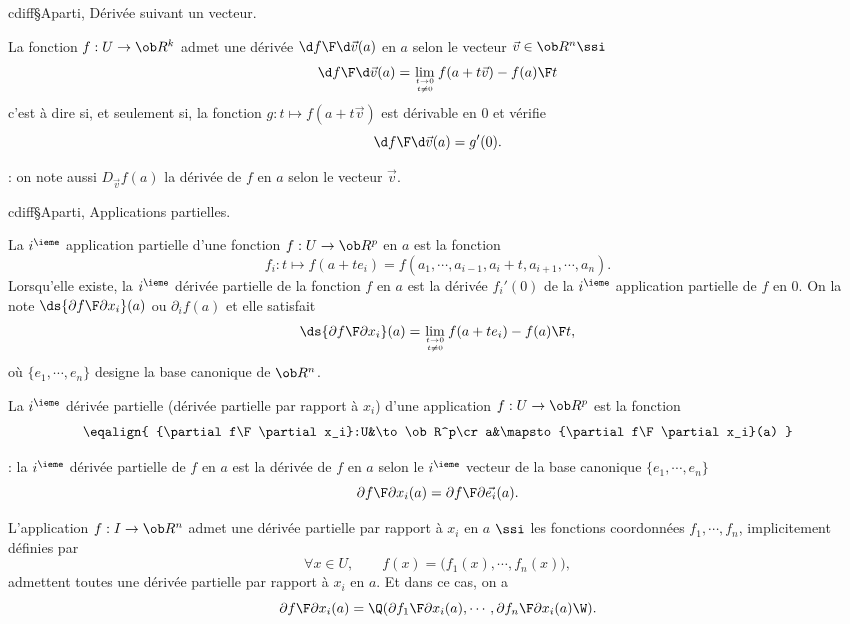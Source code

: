 \Subsection cdiff§Aparti, D\'eriv\'ee suivant un vecteur.


\Definition[$a\in U$ ouvert de $\ob R^n$]
La fonction $f:U\to\ob R^k$ admet une d\'eriv\'ee ${\d f\F\d\vec v}(a)$ en $a$ selon le vecteur $\vec v\in\ob R^n\ssi$ 
$$
{\d f\F\d\vec v}(a)=\lim\limits_{t\to0\atop t\neq 0}{f(a+t\vec v)-f(a)\F t}
$$
c'est \`a dire si, et seulement si, la fonction $g:t\mapsto f(a+t\vec v)$ est d\'erivable en $0$ et v\'erifie $$
{\d f\F\d\vec v}(a)=g'(0).
$$ 

\Remarque : on note aussi $D_{\vec v}f(a)$ la d\'eriv\'ee de $f$ en $a$ selon le vecteur $\vec v$. 
\bigskip

\Subsection cdiff§Aparti, Applications partielles. 

\Definition [$a=(a_1,\cdots,a_n)\in U$ ouvert de $\ob R^n$, $1\le i\le n$]
La $i^\ieme$ application partielle d'une fonction $f:U\to\ob R^p$ en $a$ est la fonction 
$$
f_i:t\mapsto f(a+te_i)=f(a_1,\cdots,a_{i-1},a_i+t,a_{i+1},\cdots,a_n).
$$
Lorsqu'elle existe, la $i^\ieme$ d\'eriv\'ee partielle de la fonction $f$ en $a$ est la d\'eriv\'ee $f_i'(0)$ de la $i^\ieme$ application partielle de $f$ en $0$. On la note $\ds {\partial f\F\partial x_i}(a)$ ou $\partial_if(a)$ et elle satisfait 
$$
\ds {\partial f\F\partial x_i}(a)=\lim_{t\to0\atop t\neq0}{f(a+te_i)-f(a)\F t},
$$
o\`u $\{e_1, \cdots, e_n\}$ designe la base canonique de $\ob R^n$. 


\Definition [$a=(a_1,\cdots,a_n)\in U$ ouvert de $\ob R^n$, $1\le i\le n$]
La $i^\ieme$ d\'eriv\'ee partielle (d\'eriv\'ee partielle par rapport \`a $x_i$) d'une application $f:U\to \ob R^p$ est 
la fonction 
$$
\eqalign{
{\partial f\F\partial x_i}:U&\to\ob R^p\cr
a&\mapsto {\partial f\F\partial x_i}(a)
}$$

\Remarque : la $i^\ieme$ d\'eriv\'ee partielle de $f$ en $a$ est la d\'eriv\'ee de $f$ en $a$ selon le $i^\ieme$ vecteur de la base canonique $\{e_1, \cdots, e_n\}$ 
$$
{\partial f\F\partial x_i}(a)={\partial f\F\partial \vec{e_i}}(a).
$$


\Theoreme [$a\in U$ ouvert de $\ob R^n$, $1\le i\le n$]
L'application $f:I\to\ob R^n$ admet une d\'eriv\'ee partielle par rapport \`a $x_i$ en $a$ $\ssi$ les fonctions coordonn\'ees $f_1, \cdots, f_n$, implicitement d\'efinies par  
$$
\forall x\in U,\qquad f(x)=\Big(f_1(x),\cdots, f_n(x)\Big),
$$
admettent toutes une d\'eriv\'ee partielle par rapport \`a $x_i$ en $a$. 
Et dans ce cas, on a 
$$
{\partial f\F\partial x_i}(a)=\Q({\partial f_1\F\partial x_i}(a),\cdots, {\partial f_n\F\partial x_i}(a)\W).
$$



